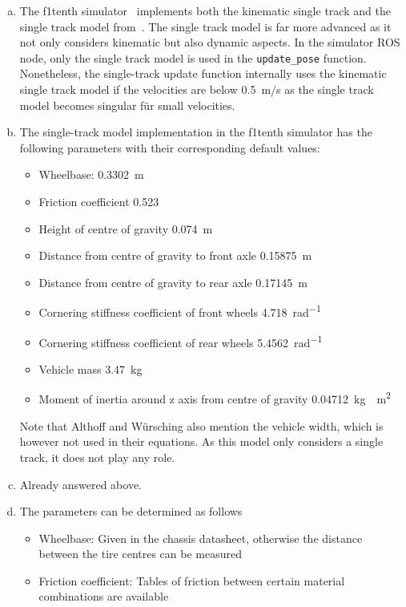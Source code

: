 \documentclass[letta4 paper]{article}
\numberwithin{equation}{section}
\newcommand{\0}{\mathbf{0}}
\begin{document}
	\begin{enumerate}[a.) ]
      \item The f1tenth simulator~\cite{f1tenth-sim} implements both the kinematic single track and the single track model from~\cite{models}. The single track model is far more advanced as it not only considers kinematic but also dynamic aspects. In the simulator ROS node, only the single track model is used in the \texttt{update\_pose} function. Nonetheless, the single-track update function internally uses the kinematic single track model if the velocities are below \SI{0.5}{m/s} as the single track model becomes singular für small velocities.
      \item The single-track model implementation in the f1tenth simulator has the following parameters with their corresponding default values: \begin{itemize}
         \item Wheelbase: \SI{0.3302}{m}
         \item Friction coefficient \num{0.523}
         \item Height of centre of gravity \SI{0.074}{m}
         \item Distance from centre of gravity to front axle \SI{0.15875}{m}
         \item Distance from centre of gravity to rear axle \SI{0.17145}{m}
         \item Cornering stiffness coefficient of front wheels \SI{4.718}{rad^{-1}}
         \item Cornering stiffness coefficient of rear wheels \SI{5.4562}{rad^{-1}}
         \item Vehicle mass \SI{3.47}{kg}
         \item Moment of inertia around z axis from centre of gravity \SI{0.04712}{kg \cdot m^2}
      \end{itemize}
      Note that Althoff and Würsching also mention the vehicle width, which is however not used in their equations. As this model only considers a single track, it does not play any role.
      \item Already answered above.
      \item The parameters can be determined as follows \begin{itemize}
         \item Wheelbase: Given in the chassis datasheet, otherwise the distance between the tire centres can be measured
         \item Friction coefficient: Tables of friction between certain material combinations are available

\end{itemize}
\end{enumerate}
\end{document}

